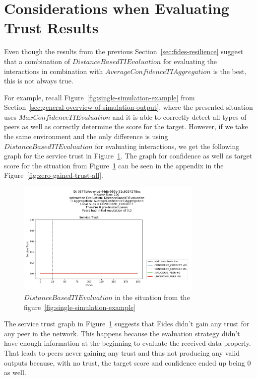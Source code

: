 \newpage
\section{Considerations when Evaluating Trust Results}
\label{sec:other-findings}

Even though the results from the previous Section~\ref{sec:fides-resilience} suggest that a combination of $DistanceBasedTIEvaluation$ for evaluating the interactions in combination with $AverageConfidenceTIAggregation$ is the best, this is not always true.

For example, recall Figure~\ref{fig:single-simulation-example} from Section~\ref{sec:general-overview-of-simulation-output}, where the presented situation uses $MaxConfidenceTIEvaluation$ and it is able to correctly detect all types of peers as well as correctly determine the score for the target.
However, if we take the same environment and the only difference is using $DistanceBasedTIEvaluation$ for evaluating interactions, we get the following graph for the service trust in  Figure~\ref{fig:zero-gained-trust}. The graph for confidence as well as target score for the situation from Figure~\ref{fig:zero-gained-trust} can be seen in the appendix in the Figure~\ref{fig:zero-gained-trust-all}.

\begin{figure}[ht]
    \centering
    \includegraphics[width=0.8\textwidth]{assets/zero_gained_trust.png}
    \caption{$DistanceBasedTIEvaluation$ in the situation from the figure~\ref{fig:single-simulation-example}}
    \label{fig:zero-gained-trust}
\end{figure}

The service trust graph in Figure~\ref{fig:zero-gained-trust} suggests that Fides didn't gain any trust for any peer in the network.
This happens because the evaluation strategy didn't have enough information at the beginning to evaluate the received data properly.
That leads to peers never gaining any trust and thus not producing any valid outputs because, with no trust, the target score and confidence ended up being $0$ as well.